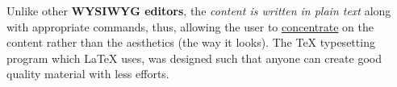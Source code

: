 \documentclass{article}
\begin{document}
	Unlike other \textbf{WYSIWYG editors}, the \emph{content is written in plain text} along with appropriate commands, thus, allowing the user to \underline{concentrate} on the content rather than the aesthetics (the way it looks). The {\large TeX} typesetting program which LaTeX uses, was designed such that anyone can create good quality {\footnotesize material with less efforts.}

    \tiny
    \lipsum[1-2]
    \normalsize
    \lipsum[3-4]
\end{document}
